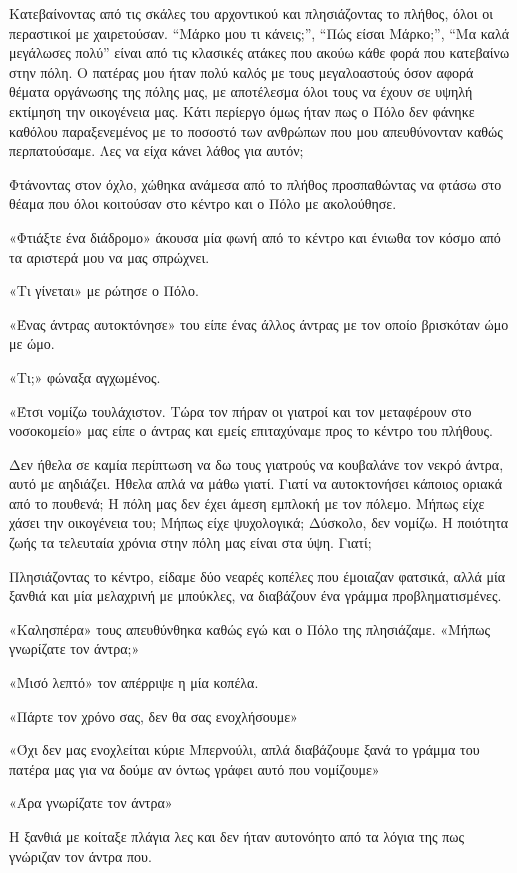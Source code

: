 \documentclass[12pt,twoside, openany]{book}
\begin{document}
Κατεβαίνοντας από τις σκάλες του αρχοντικού και πλησιάζοντας το πλήθος, όλοι οι περαστικοί με χαιρετούσαν. “Μάρκο μου τι κάνεις;”, “Πώς είσαι Μάρκο;”, “Μα καλά μεγάλωσες πολύ” είναι από τις κλασικές ατάκες που ακούω κάθε φορά που κατεβαίνω στην πόλη. Ο πατέρας μου ήταν πολύ καλός με τους μεγαλοαστούς όσον αφορά θέματα οργάνωσης της πόλης μας, με αποτέλεσμα όλοι τους να έχουν σε υψηλή εκτίμηση την οικογένεια μας. Κάτι περίεργο όμως ήταν πως ο Πόλο δεν φάνηκε καθόλου παραξενεμένος με το ποσοστό των ανθρώπων που μου απευθύνονταν καθώς περπατούσαμε. Λες να είχα κάνει λάθος για αυτόν;

Φτάνοντας στον όχλο, χώθηκα ανάμεσα από το πλήθος προσπαθώντας να φτάσω στο θέαμα που όλοι κοιτούσαν στο κέντρο και ο Πόλο με ακολούθησε. 

«Φτιάξτε ένα διάδρομο» άκουσα μία φωνή από το κέντρο και ένιωθα τον κόσμο από τα αριστερά μου να μας σπρώχνει.

«Τι γίνεται» με ρώτησε ο Πόλο.

«Ένας άντρας αυτοκτόνησε» του είπε ένας άλλος άντρας με τον οποίο βρισκόταν ώμο με ώμο.

«Τι;» φώναξα αγχωμένος.

«Έτσι νομίζω τουλάχιστον. Τώρα τον πήραν οι γιατροί και τον μεταφέρουν στο νοσοκομείο» μας είπε ο άντρας και εμείς επιταχύναμε προς το κέντρο του πλήθους.

Δεν ήθελα σε καμία περίπτωση να δω τους γιατρούς να κουβαλάνε τον νεκρό άντρα, αυτό με αηδιάζει. Ήθελα απλά να μάθω γιατί. Γιατί να αυτοκτονήσει κάποιος οριακά από το πουθενά; Η πόλη μας δεν έχει άμεση εμπλοκή με τον πόλεμο. Μήπως είχε χάσει την οικογένεια του; Μήπως είχε ψυχολογικά; Δύσκολο, δεν νομίζω. Η ποιότητα ζωής τα τελευταία χρόνια στην πόλη μας είναι στα ύψη. Γιατί;

Πλησιάζοντας το κέντρο, είδαμε δύο νεαρές κοπέλες που έμοιαζαν φατσικά, αλλά μία ξανθιά και μία μελαχρινή με μπούκλες, να διαβάζουν ένα γράμμα προβληματισμένες.

«Καλησπέρα» τους απευθύνθηκα καθώς εγώ και ο Πόλο της πλησιάζαμε. «Μήπως γνωρίζατε τον άντρα;»

«Μισό λεπτό» τον απέρριψε η μία κοπέλα.

«Πάρτε τον χρόνο σας, δεν θα σας ενοχλήσουμε»

«Όχι δεν μας ενοχλείται κύριε Μπερνούλι, απλά διαβάζουμε ξανά το γράμμα του πατέρα μας για να δούμε αν όντως γράφει αυτό που νομίζουμε»

«Άρα γνωρίζατε τον άντρα»

Η ξανθιά με κοίταξε πλάγια λες και δεν ήταν αυτονόητο από τα λόγια της πως γνώριζαν τον άντρα που.
\end{document}
